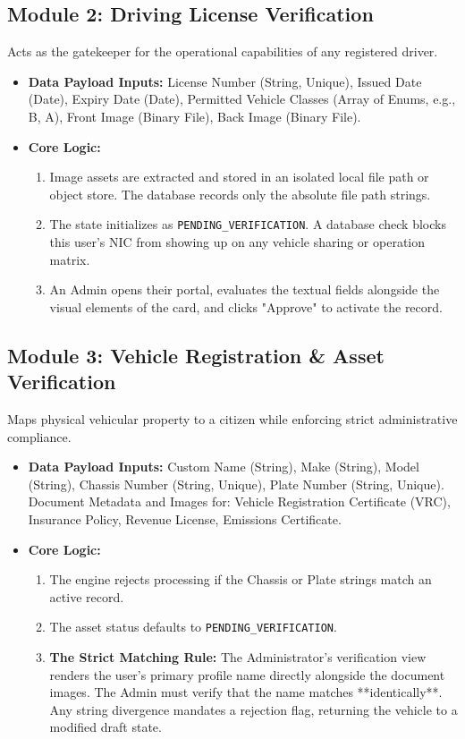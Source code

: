 \documentclass[12pt, a4paper]{article}
\begin{document}
\subsection{Module 2: Driving License Verification}
Acts as the gatekeeper for the operational capabilities of any registered driver.
\begin{itemize}
    \item \textbf{Data Payload Inputs:} License Number (String, Unique), Issued Date (Date), Expiry Date (Date), Permitted Vehicle Classes (Array of Enums, e.g., B, A), Front Image (Binary File), Back Image (Binary File).
    \item \textbf{Core Logic:}
    \begin{enumerate}
        \item Image assets are extracted and stored in an isolated local file path or object store. The database records only the absolute file path strings.
        \item The state initializes as \texttt{PENDING\_VERIFICATION}. A database check blocks this user's NIC from showing up on any vehicle sharing or operation matrix.
        \item An Admin opens their portal, evaluates the textual fields alongside the visual elements of the card, and clicks "Approve" to activate the record.
    \end{enumerate}
\end{itemize}

\subsection{Module 3: Vehicle Registration \& Asset Verification}
Maps physical vehicular property to a citizen while enforcing strict administrative compliance.
\begin{itemize}
    \item \textbf{Data Payload Inputs:} Custom Name (String), Make (String), Model (String), Chassis Number (String, Unique), Plate Number (String, Unique). Document Metadata and Images for: Vehicle Registration Certificate (VRC), Insurance Policy, Revenue License, Emissions Certificate.
    \item \textbf{Core Logic:}
    \begin{enumerate}
        \item The engine rejects processing if the Chassis or Plate strings match an active record.
        \item The asset status defaults to \texttt{PENDING\_VERIFICATION}.
        \item \textbf{The Strict Matching Rule:} The Administrator's verification view renders the user's primary profile name directly alongside the document images. The Admin must verify that the name matches **identically**. Any string divergence mandates a rejection flag, returning the vehicle to a modified draft state.
    \end{enumerate}
\end{itemize}
\end{document}

